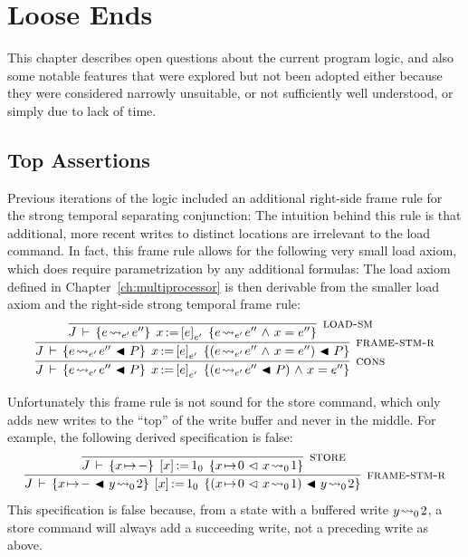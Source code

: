 \documentclass[11pt]{report}
\begin{document}
\chapter{Loose Ends}

This chapter describes open questions about the current program logic, and also some notable features that were explored but not been adopted either because they were considered narrowly unsuitable, or not sufficiently well understood, or simply due to lack of time. 

\section{Top Assertions}
\label{sec:top-assertion}

Previous iterations of the logic included an additional right-side frame rule for the strong temporal separating conjunction:  The intuition behind this rule is that additional, more recent writes to distinct locations are irrelevant to the load command. In fact, this frame rule allows for the following very small load axiom, which does require parametrization by any additional formulas:  The load axiom defined in Chapter~\ref{ch:multiprocessor} is then derivable from the smaller load axiom and the right-side strong temporal frame rule: \[ \infer[\textsc{cons}]{\spec{J}{e \fwrite{e'} e'' \fsseq P}{\cload{x}{e}_{e'}}{(e \fwrite{e'} e'' \fsseq P) \conj x = e''}}{\infer[\textsc{frame-stm-r}]{\spec{J}{e \fwrite{e'} e'' \fsseq P}{\cload{x}{e}_{e'}}{(e \fwrite{e'} e'' \conj x = e'') \fsseq P }}{\infer[\textsc{load-sm}]{\spec{J}{e \fwrite{e'} e''}{\cload{x}{e}_{e'}}{e \fwrite{e'} e'' \conj x = e''}}{}}}\]

Unfortunately this frame rule is not sound for the store command, which only adds new writes to the ``top'' of the write buffer and never in the middle. For example, the following derived specification is false: \[ \infer[\textsc{frame-stm-r}]{\spec{J}{x \fpointsto - \fsseq y \fwrite{0} 2}{\cstore{x}{1}_0}{(x \fpointsto 0 \fseq x \fwrite{0} 1) \fsseq y \fwrite{0} 2}}{\infer[\textsc{store}]{\spec{J}{x \fpointsto - }{\cstore{x}{1}_0}{x \fpointsto 0 \fseq x \fwrite{0} 1}}{}}\] This specification is false because, from a state with a buffered write $y \!\leadsto_{0}\! 2$, a store command will always add a succeeding write, not a preceding write as above. 
\end{document}
